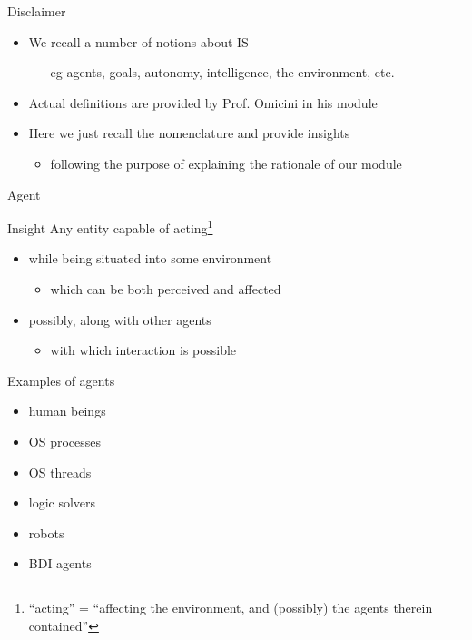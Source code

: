 \documentclass[presentation]{beamer}\mode<presentation>{\usetheme{AMSBolognaFC}}
\begin{document}
\begin{frame}[c]{Disclaimer}
%
\begin{itemize}
	\item We recall a number of notions about IS
	\begin{itemize}
		\item[eg] agents, goals, autonomy, intelligence, the environment, etc.
	\end{itemize}

	\item Actual definitions are provided by Prof. Omicini in his module

	\item Here we just recall the nomenclature and provide insights
	\begin{itemize}
		\item following the purpose of explaining the rationale of our module
	\end{itemize}
\end{itemize}
%
\end{frame}

\begin{frame}[c]{Agent}
%
\begin{block}{Insight}
	Any entity capable of \alert{acting}\footnote{``acting'' = ``affecting the environment, and (possibly) the agents therein contained''}
	\begin{itemize}
		\item while being situated into some \alert{environment}
		\begin{itemize}
			\item which can be both \alert{perceived} and \alert{affected}
		\end{itemize}

		\item possibly, along with other agents
		\begin{itemize}
			\item with which \alert{interaction} is possible
		\end{itemize}
	\end{itemize}
\end{block}
%
\begin{exampleblock}{Examples of agents}
	\begin{multicols}{2}
		\begin{itemize}
			\item human beings
			\item OS processes
			\item OS threads
			\item logic solvers
			\item robots
			\item BDI agents
		\end{itemize}
	\end{multicols}
\end{exampleblock}
%
\end{frame}
\end{document}
